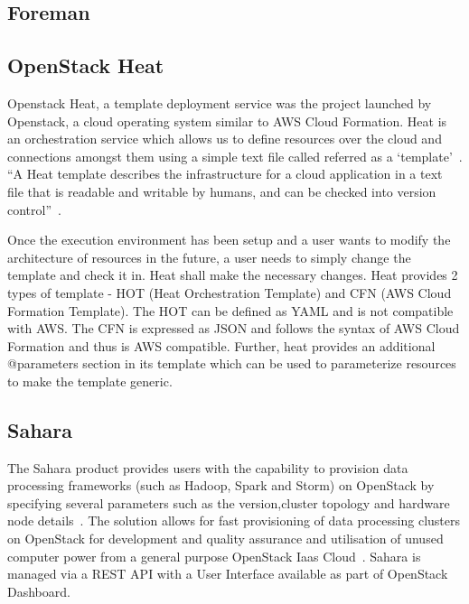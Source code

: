      \pv

\subsection{Foreman}

\pv 

\subsection{OpenStack Heat}

Openstack Heat, a template deployment service was the project launched
by Openstack, a cloud operating system similar to AWS Cloud
Formation. Heat is an orchestration service which allows us to define
resources over the cloud and connections amongst them using a simple
text file called referred as a
‘template’~\cite{www-heat-blog-introduction}.  ``A Heat template
describes the infrastructure for a cloud application in a text file
that is readable and writable by humans, and can be checked into
version control''~\cite{www-heat-wiki}.

     Once the execution environment has been setup and a user wants to
     modify the architecture of resources in the future, a user needs
     to simply change the template and check it in. Heat shall make
     the necessary changes. Heat provides 2 types of template -
     HOT (Heat Orchestration Template) and CFN (AWS Cloud Formation
     Template). The HOT can be defined as YAML and is not compatible
     with AWS. The CFN is expressed as JSON and follows the syntax of
     AWS Cloud Formation and thus is AWS compatible. Further, heat
     provides an additional @parameters section in its template which
     can be used to parameterize resources to make the template
     generic.

     \pv

\subsection{Sahara}

The Sahara product provides users with the capability to provision
data processing frameworks (such as Hadoop, Spark and Storm) on
OpenStack by specifying several parameters such as the version,cluster
topology and hardware node details~\cite{www-openStack}. The solution
allows for fast provisioning of data processing clusters on OpenStack
for development and quality assurance and utilisation of unused
computer power from a general purpose OpenStack Iaas
Cloud~\cite{www-Sahara}.  Sahara is managed via a REST API with a User
Interface available as part of OpenStack Dashboard.

